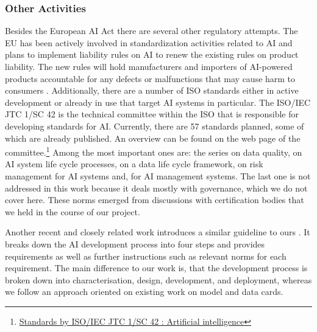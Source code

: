 \subsubsection{Other Activities}
\label{sec:other_activities}
Besides the European \ac{AI} Act there are several other regulatory attempts. %
The EU has been actively involved in standardization activities related to \ac{AI} and plans to implement liability rules on \ac{AI} to renew the existing rules on product liability. The new rules will hold manufacturers and importers of AI-powered products accountable for any defects or malfunctions that may cause harm to consumers \citep{EULiability}. Additionally, there are a number of ISO standards either in active development or already in use that target \ac{AI} systems in particular. The ISO/IEC JTC 1/SC 42 is the technical committee within the \ac{ISO} that is responsible for developing standards for \ac{AI}. Currently, there are 57 standards planned, some of which are already published. An overview can be found on the web page of the committee.\footnote{\href{https://www.iso.org/committee/6794475/x/catalogue/p/1/u/1/w/0/d/0}{Standards by ISO/IEC JTC 1/SC 42 : Artificial intelligence}}
Among the most important ones are: the \cite{ISO5259} series on data quality, \cite{ISO5338} on AI system life cycle processes, \cite{ISO8183} on a data life cycle framework, \cite{ISO23894} on risk management for AI systems and, \cite{ISO42001} for AI management systems. The last one is not addressed in this work because it deals mostly with governance, which we do not cover here. These norms emerged from discussions with certification bodies that we held in the course of our project.

Another recent and closely related work introduces a similar guideline to ours \citep{Wittenbrink2022_LeitfadenQualitatsmanagementKI}. It breaks down the AI development process into four steps and provides requirements as well as further instructions such as relevant norms for each requirement. The main difference to our work is, that the development process is broken down into characterisation, design, development, and deployment, whereas we follow an approach oriented on existing work on model and data cards. 

